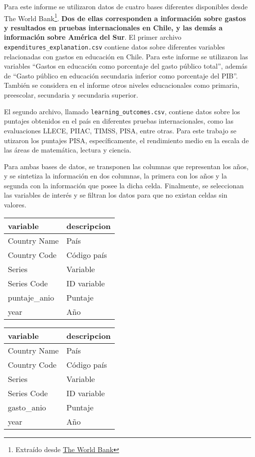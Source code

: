\documentclass[
]{article}
\begin{document}
Para este informe se utilizaron datos de cuatro bases diferentes
disponibles desde The World Bank\footnote{Extraído desde
  \href{https://datatopics.worldbank.org/education/}{The World Bank}}.
\textbf{Dos de ellas corresponden a información sobre gastos y
resultados en pruebas internacionales en Chile, y las demás a
información sobre América del Sur}. El primer archivo
\texttt{expenditures\_explanation.csv} contiene datos sobre diferentes
variables relacionadas con gastos en educación en Chile. Para este
informe se utilizaron las variables ``Gastos en educación como
porcentaje del gasto público total'', además de ``Gasto público en
educación secundaria inferior como porcentaje del PIB''. También se
considera en el informe otros niveles educacionales como primaria,
preescolar, secundaria y secundaria superior.

El segundo archivo, llamado \texttt{learning\_outcomes.csv}, contiene
datos sobre los puntajes obtenidos en el país en diferentes pruebas
internacionales, como las evaluaciones LLECE, PIIAC, TIMSS, PISA, entre
otras. Para este trabajo se utizaron los puntajes PISA, específicamente,
el rendimiento medio en la escala de las áreas de matemática, lectura y
ciencia.

Para ambas bases de datos, se transponen las columnas que representan
los años, y se sintetiza la información en dos columnas, la primera con
los años y la segunda con la información que posee la dicha celda.
Finalmente, se seleccionan las variables de interés y se filtran los
datos para que no existan celdas sin valores.

\captionsetup[table]{labelformat=empty,skip=1pt}
\begin{longtable}{ll}
\toprule
variable & descripcion \\ 
\midrule
Country Name & País \\ 
Country Code & Código país \\ 
Series & Variable \\ 
Series Code & ID variable \\ 
puntaje\_anio & Puntaje \\ 
year & Año \\ 
 \bottomrule
\end{longtable}
\captionsetup[table]{labelformat=empty,skip=1pt}
\begin{longtable}{ll}
\toprule
variable & descripcion \\ 
\midrule
Country Name & País \\ 
Country Code & Código país \\ 
Series & Variable \\ 
Series Code & ID variable \\ 
gasto\_anio & Puntaje \\ 
year & Año \\ 
 \bottomrule
\end{longtable}
\end{document}
